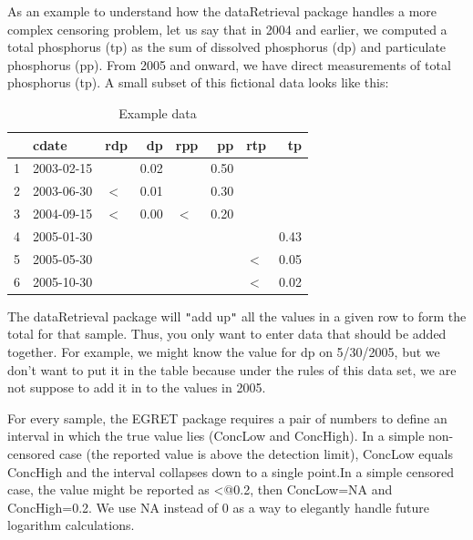 \documentclass[a4paper,11pt]{article}\usepackage[]{graphicx}\usepackage[]{color}
\begin{document}
As an example to understand how the dataRetrieval package handles a more complex censoring problem, let us say that in 2004 and earlier, we computed a total phosphorus (tp) as the sum of dissolved phosphorus (dp) and particulate phosphorus (pp). From 2005 and onward, we have direct measurements of total phosphorus (tp). A small subset of this fictional data looks like this:

\begin{center}

\begin{table}[ht]
\centering
\begin{tabular}{rllrlrlr}
  \hline
 & cdate & rdp & dp & rpp & pp & rtp & tp \\ 
  \hline
1 & 2003-02-15 &  & 0.02 &  & 0.50 &  &  \\ 
  2 & 2003-06-30 & $<$ & 0.01 &  & 0.30 &  &  \\ 
  3 & 2004-09-15 & $<$ & 0.00 & $<$ & 0.20 &  &  \\ 
  4 & 2005-01-30 &  &  &  &  &  & 0.43 \\ 
  5 & 2005-05-30 &  &  &  &  & $<$ & 0.05 \\ 
  6 & 2005-10-30 &  &  &  &  & $<$ & 0.02 \\ 
   \hline
\end{tabular}
\caption{Example data} 
\end{table}



\end{center}


The dataRetrieval package will \texttt{"}add up\texttt{"} all the values in a given row to form the total for that sample. Thus, you only want to enter data that should be added together. For example, we might know the value for dp on 5/30/2005, but we don't want to put it in the table because under the rules of this data set, we are not suppose to add it in to the values in 2005.

For every sample, the EGRET package requires a pair of numbers to define an interval in which the true value lies (ConcLow and ConcHigh). In a simple non-censored case (the reported value is above the detection limit), ConcLow equals ConcHigh and the interval collapses down to a single point.In a simple censored case, the value might be reported as \verb@<@0.2, then ConcLow=NA and ConcHigh=0.2. We use NA instead of 0 as a way to elegantly handle future logarithm calculations.
\end{document}

